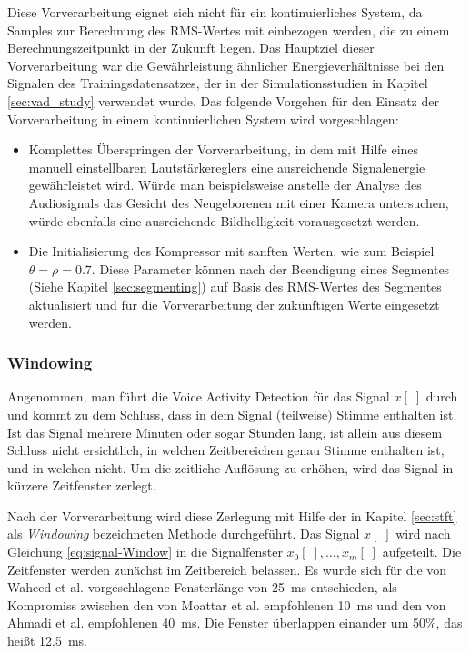 Diese Vorverarbeitung eignet sich nicht für ein kontinuierliches System, da Samples zur Berechnung des RMS-Wertes mit einbezogen werden, die zu einem Berechnungszeitpunkt in der Zukunft liegen. Das Hauptziel dieser Vorverarbeitung war die Gewährleistung ähnlicher Energieverhältnisse bei den Signalen des Trainingsdatensatzes, der in der Simulationsstudien in Kapitel \ref{sec:vad_study} verwendet wurde. Das folgende Vorgehen für den Einsatz der Vorverarbeitung in einem kontinuierlichen System wird vorgeschlagen:
\begin{itemize}
	\item Komplettes Überspringen der Vorverarbeitung, in dem mit Hilfe eines manuell einstellbaren Lautstärkereglers eine ausreichende Signalenergie gewährleistet wird. Würde man beispielsweise anstelle der Analyse des Audiosignals das Gesicht des Neugeborenen mit einer Kamera untersuchen, würde ebenfalls eine ausreichende Bildhelligkeit vorausgesetzt werden.
	\item Die Initialisierung des Kompressor mit \grqq sanften Werten\grqq , wie zum Beispiel $\theta = \rho = 0.7$. Diese Parameter können nach der Beendigung eines Segmentes (Siehe Kapitel \ref{sec:segmenting}) auf Basis des RMS-Wertes des Segmentes aktualisiert und für die Vorverarbeitung der zukünftigen Werte eingesetzt werden.
\end{itemize}

\subsubsection{Windowing}
\label{sec:windowing}

Angenommen, man führt die Voice Activity Detection für das Signal $x[\;]$ durch und kommt zu dem Schluss, dass in dem Signal (teilweise) Stimme enthalten ist. Ist das Signal mehrere Minuten oder sogar Stunden lang, ist allein aus diesem Schluss nicht ersichtlich, in welchen Zeitbereichen genau Stimme enthalten ist, und in welchen nicht. Um die zeitliche Auflösung zu erhöhen, wird das Signal in kürzere Zeitfenster zerlegt.

Nach der Vorverarbeitung wird diese Zerlegung mit Hilfe der in Kapitel \ref{sec:stft} als \emph{Windowing} bezeichneten Methode durchgeführt. Das Signal $x[\;]$ wird nach Gleichung \ref{eq:signal-Window} in die Signalfenster $x_0[\;] , \ldots , x_m[\;]$ aufgeteilt. Die Zeitfenster werden zunächst im Zeitbereich belassen. Es wurde sich für die von Waheed et al. \cite{vad_entropy} vorgeschlagene Fensterlänge von \SI{25}{\milli\second} entschieden, als Kompromiss zwischen den von Moattar et al. \cite{vad_Easy} empfohlenen \SI{10}{\milli\second} und den von Ahmadi et al. \cite{vad_ceps} empfohlenen \SI{40}{\milli\second}. Die Fenster überlappen einander um 50\%, das heißt \SI{12.5}{\milli\second}.

